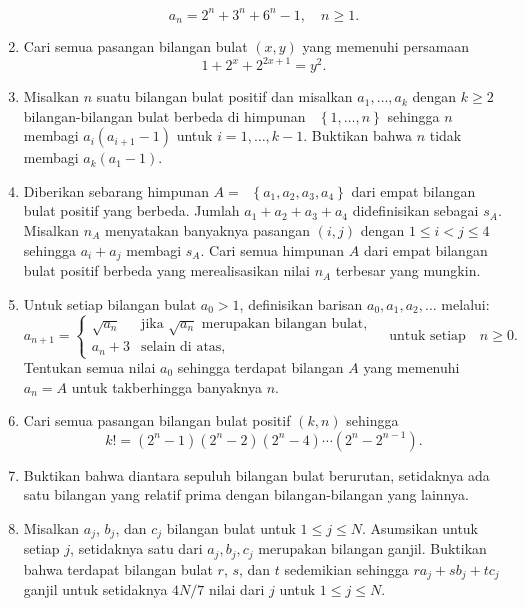 \documentclass[12pt]{article}
\newcommand*\lrbr[1]{\mathop{}\!\left\lbrace#1\right\rbrace}
\begin{document}
\begin{enumerate}[leftmargin=*]
		\[ a_{n} = 2^{n} + 3^{n} + 6^{n} - 1, \quad n \geq 1. \]
		\item Cari semua pasangan bilangan bulat $ \left(x, y\right) $ yang memenuhi persamaan
		\[ 1 + 2^{x} + 2^{2x + 1} = y^{2}. \]
		\item Misalkan $ n $ suatu bilangan bulat positif dan misalkan $ a_{1}, \dots, a_{k} $ dengan $ k \geq 2 $ bilangan-bilangan bulat berbeda di himpunan $ \lrbr{1, \dots, n} $ sehingga $ n $ membagi $ a_{i}\left(a_{i + 1} - 1\right) $ untuk $ i = 1, \dots, k - 1 $. Buktikan bahwa $ n $ tidak membagi $ a_{k}\left(a_{1} - 1\right) $.
		\item Diberikan sebarang himpunan $ A = \lrbr{a_{1}, a_{2}, a_{3}, a_{4}} $ dari empat bilangan bulat positif yang berbeda. Jumlah $ a_{1} + a_{2} + a_{3} + a_{4} $ didefinisikan sebagai $ s_{A} $. Misalkan $ n_{A} $ menyatakan banyaknya pasangan $ \left(i, j\right) $ dengan $ 1 \leq i < j \leq 4 $ sehingga $ a_{i} + a_{j} $ membagi $ s_{A} $. Cari semua himpunan $ A $ dari empat bilangan bulat positif berbeda yang merealisasikan nilai $ n_{A} $ terbesar yang mungkin.
		\item Untuk setiap bilangan bulat $ a_{0} > 1 $, definisikan barisan $ a_{0}, a_{1}, a_{2}, \dots $ melalui:
		\[
			a_{n + 1} =	\begin{cases}
							\sqrt{a_{n}} & \mbox{jika } \sqrt{a_{n}} \mbox{ merupakan bilangan bulat}, \\
							a_{n} + 3 & \mbox{selain di atas},
						\end{cases}
			\quad \mbox{untuk setiap} \quad n \geq 0.
		\]
		Tentukan semua nilai $ a_{0} $ sehingga terdapat bilangan $ A $ yang memenuhi $ a_{n} = A $ untuk takberhingga banyaknya $ n $.
		\item Cari semua pasangan bilangan bulat positif $ \left(k, n\right) $ sehingga
		\[ k! = \left(2^{n} - 1\right)\left(2^{n} - 2\right)\left(2^{n} - 4\right) \cdots \left(2^{n} - 2^{n - 1}\right). \]
		\item Buktikan bahwa diantara sepuluh bilangan bulat berurutan, setidaknya ada satu bilangan yang relatif prima dengan bilangan-bilangan yang lainnya.
		\item Misalkan $ a_{j} $, $ b_{j} $, dan $ c_{j} $ bilangan bulat untuk $ 1 \leq j \leq N $. Asumsikan untuk setiap $ j $, setidaknya satu dari $ a_{j}, b_{j}, c_{j} $ merupakan bilangan ganjil. Buktikan bahwa terdapat bilangan bulat $ r $, $ s $, dan $ t $ sedemikian sehingga $ ra_{j} + sb_{j} + tc_{j} $ ganjil untuk setidaknya $ 4N/7 $ nilai dari $ j $ untuk $ 1 \leq j \leq N $.

\end{enumerate}
\end{document}
